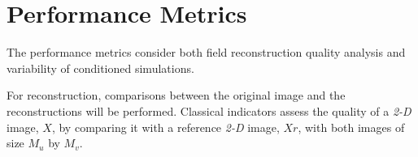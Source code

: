 

































































	
	



\section{Performance Metrics}

The performance metrics consider both field reconstruction quality analysis and variability of conditioned simulations.

For reconstruction, comparisons between the original image and the reconstructions will be performed. Classical indicators assess the quality of a \emph{2-D} image, $X$, by comparing it with a reference \emph{2-D} image, $Xr$, \cite{Gonzalez2002_a} with both images of size $M_u$ by $M_v$.

